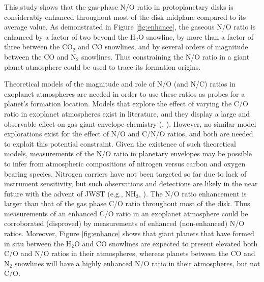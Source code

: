 \documentclass[apj]{emulateapj}
\newcommand{\emgr}[1]{\emph{ \color{gray} #1}}
\begin{document}
This study shows that the gas-phase N/O ratio in protoplanetary disks is considerably enhanced throughout most of the disk midplane compared to its average value. As demonstrated in Figure \ref{fig:enhance}, the gaseous N/O ratio is enhanced by a factor of two beyond the H$_2$O snowline, by more than a factor of three between the CO$_2$ and CO snowlines, and by several orders of magnitude between the CO and N$_2$ snowlines. Thus constraining the N/O ratio in a giant planet atmosphere could be used to trace its formation origins. 

Theoretical models of the magnitude and role of N/O (and N/C) ratios in exoplanet atmospheres are needed in order to use these ratios as probes for a planet's formation location. Models that explore the effect of varying the C/O ratio in exoplanet atmospheres exist in literature, and they display a large and observable effect on gas giant envelope chemistry (\citealt{lodders09}, \citealt{molliere15}). However, no similar model explorations exist for the effect of N/O and C/N/O ratios, and both are needed to exploit this potential constraint. Given the existence of such theoretical models, measurements of the N/O ratio in planetary envelopes may be possible to infer from atmospheric compositions of nitrogen versus carbon and oxygen bearing species. Nitrogen carriers have not been targeted so far due to lack of instrument sensitivity, but such observations and detections are likely in the near future with the advent of JWST (e.g., NH$_3$, \citealt{greene16}). The N/O ratio enhancement is larger than that of the gas phase C/O ratio throughout most of the disk. Thus measurements of an enhanced C/O ratio in an exoplanet atmosphere could be corroborated (disproved) by measurements of enhanced (non-enhanced) N/O ratios. Moreover, Figure \ref{fig:enhance} shows that giant planets that have formed in situ between the H$_2$O and CO snowlines are expected to present elevated both C/O and N/O ratios in their atmospheres, whereas planets between the CO and N$_2$ snowlines will have a highly enhanced N/O ratio in their atmospheres, but not C/O.  
\end{document}
